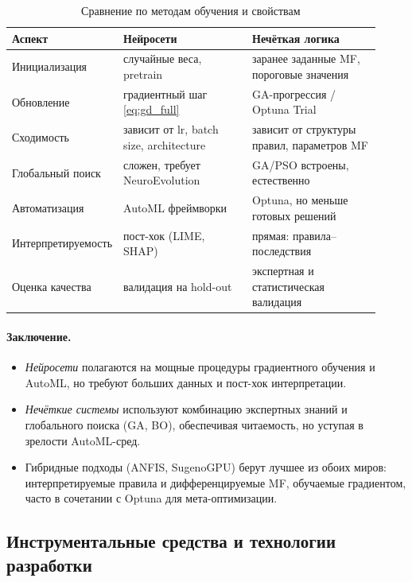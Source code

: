 \begin{table}[H]
\centering\small
\caption{Сравнение по методам обучения и свойствам}
\label{tab:nn_fuzzy_training}
\begin{tabular}{@{}p{0.20\linewidth}p{0.36\linewidth}p{0.36\linewidth}@{}}
\toprule
\textbf{Аспект} & \textbf{Нейросети} & \textbf{Нечёткая логика} \\ \midrule
Инициализация & случайные веса, pretrain & заранее заданные MF, пороговые значения \\[4pt]
Обновление & градиентный шаг \eqref{eq:gd_full} & GA-прогрессия / Optuna Trial \\[4pt]
Сходимость & зависит от lr, batch size, architecture & зависит от структуры правил, параметров MF \\[4pt]
Глобальный поиск & сложен, требует NeuroEvolution & GA/PSO встроены, естественно \\[4pt]
Автоматизация & AutoML фреймворки & Optuna, но меньше готовых решений \\[4pt]
Интерпретируемость  & пост-хок (LIME, SHAP) & прямая: правила–последствия \\[4pt]
Оценка качества & валидация на hold-out & экспертная и статистическая валидация \\ 
\bottomrule
\end{tabular}
\end{table}

\paragraph{Заключение.}
\begin{itemize}
  \item \emph{Нейросети} полагаются на мощные процедуры градиентного обучения и AutoML, но требуют больших данных и пост-хок интерпретации.
  \item \emph{Нечёткие системы} используют комбинацию экспертных знаний и глобального поиска (GA, BO), обеспечивая читаемость, но уступая в зрелости AutoML-сред.
  \item Гибридные подходы (ANFIS, SugenoGPU) берут лучшее из обоих миров: интерпретируемые правила и дифференцируемые MF, обучаемые градиентом, часто в сочетании с Optuna для мета-оптимизации.
\end{itemize}

\subsection{Инструментальные средства и технологии разработки}
\label{subsec:tools}

